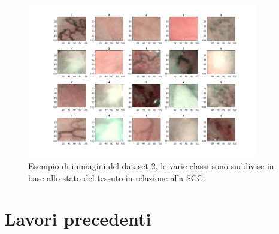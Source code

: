 \begin{figure}[ht]
    \centering
    \includegraphics[width=0.9\textwidth]{introduzione/dataset-2-ml.JPG}
    \caption[Esempio di immagini del dataset 2]{Esempio di immagini del dataset 2, le varie classi sono suddivise in base allo stato del tessuto in relazione alla SCC.}
    \label{fig:dataset2ml}
\end{figure}

\section{Lavori precedenti}\label{lavori-precedenti}